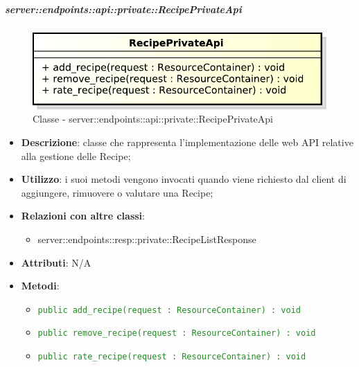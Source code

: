     \subparagraph{server::endpoints::api::private::RecipePrivateApi} %
    \label{subp:bdsm_app_server_endpoints_api_private_recipeprivateapi}
	\begin{figure}[!htbp]
		\centering
		\centerline{\includegraphics[scale=0.6]{./images/server/classes/endpoints/recipe_private_api.pdf}}
		\caption{Classe - server::endpoints::api::private::RecipePrivateApi}
	\end{figure}
    \begin{itemize}
      \item \textbf{Descrizione}: classe che rappresenta l'implementazione delle web API relative alla gestione delle Recipe;
      \item \textbf{Utilizzo}: i suoi metodi vengono invocati quando viene richiesto dal client di aggiungere, rimuovere o valutare una Recipe;
      \item \textbf{Relazioni con altre classi}:
        \begin{itemize}
          \item server::endpoints::resp::private::RecipeListResponse
        \end{itemize}
		\item \textbf{Attributi}: N/A
		\item \textbf{Metodi}:
			\begin{itemize}
				\item \textcolor{forestgreen}{\texttt{public add\_recipe(request : ResourceContainer) : void}}
				\item \textcolor{forestgreen}{\texttt{public remove\_recipe(request : ResourceContainer) : void}}
				\item \textcolor{forestgreen}{\texttt{public rate\_recipe(request : ResourceContainer) : void}}
     	 \end{itemize}
      \end{itemize}

